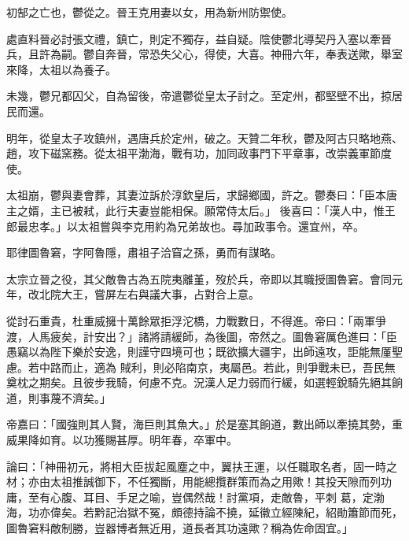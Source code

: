 \begin{pinyinscope}
 初郜之亡也，鬱從之。晉王克用妻以女，用為新州防禦使。



 處直料晉必討張文禮，鎮亡，則定不獨存，益自疑。陰使鬱北導契丹入塞以牽晉兵，且許為嗣。鬱自奔晉，常恐失父心，得使，大喜。神冊六年，奉表送歟，舉室來降，太祖以為養子。



 未幾，鬱兄都囚父，自為留後，帝遣鬱從皇太子討之。至定州，都堅壁不出，掠居民而還。



 明年，從皇太子攻鎮州，遇唐兵於定州，破之。天贊二年秋，鬱及阿古只略地燕、趙，攻下磁窯務。從太祖平渤海，戰有功，加同政事門下平章事，改崇義軍節度使。



 太祖崩，鬱與妻會葬，其妻泣訴於淳欽皇后，求歸鄉國，許之。鬱奏曰：「臣本唐主之婿，主已被弒，此行夫妻豈能相保。願常侍太后。」
 後喜曰：「漢人中，惟王郎最忠孝。」以太祖嘗與李克用約為兄弟故也。尋加政事令。還宜州，卒。



 耶律圖魯窘，字阿魯隱，肅祖子洽窅之孫，勇而有謀略。



 太宗立晉之役，其父敵魯古為五院夷離堇，歿於兵，帝即以其職授圖魯窘。會同元年，改北院大王，嘗屏左右與議大事，占對合上意。



 從討石重貴，杜重威擁十萬餘眾拒浮沱橋，力戰數日，不得進。帝曰：「兩軍爭渡，人馬疲矣，計安出？」諸將請緩師，為後圖，帝然之。圖魯窘厲色進曰：「臣愚竊以為陛下樂於安逸，則謹守四境可也；既欲擴大疆宇，出師遠攻，詎能無厪聖慮。若中路而止，適為
 賊利，則必陷南京，夷屬邑。若此，則爭戰未已，吾民無奠枕之期矣。且彼步我騎，何慮不克。況漢人足力弱而行緩，如選輕銳騎先絕其餉道，則事蔑不濟矣。」



 帝嘉曰：「國強則其人賢，海巨則其魚大。」於是塞其餉道，數出師以牽撓其勢，重威果降如育。以功獲賜甚厚。明年春，卒軍中。



 論曰：「神冊初元，將相大臣拔起風塵之中，翼扶王運，以任職取名者，固一時之材；亦由太祖推誠御下，不任獨斷，用能總攬群策而為之用歟！其投天隙而列功庸，至有心腹、耳目、手足之喻，豈偶然哉！討黨項，走敵魯，平刺
 葛，定渤海，功亦偉矣。若黔記治獄不冤，頗德持論不撓，延徽立經陳紀，紹勛簫節而死，圖魯窘料敵制勝，豈器博者無近用，道長者其功遠歟？稱為佐命固宜。」



\end{pinyinscope}
